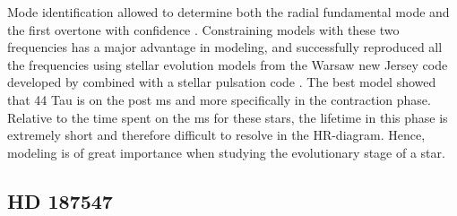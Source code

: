 %
%
%
%
%



Mode identification allowed to determine both the radial fundamental mode and the first overtone with confidence \citet{lenz2008asteroseismic}. Constraining models with these two frequencies has a major advantage in modeling, and \citet{lenz2010delta} successfully reproduced all the frequencies using stellar evolution models from the Warsaw new Jersey code developed by combined with a stellar pulsation code \citep{paczynski1969envelopes}. The best model showed that 44 Tau is on the post ms and more specifically in the contraction phase. Relative to the time spent on the ms for these stars, the lifetime in this phase is extremely short and therefore difficult to resolve in the HR-diagram. Hence, modeling is of great importance when studying the evolutionary stage of a star. 
\\


\subsection{HD 187547}

